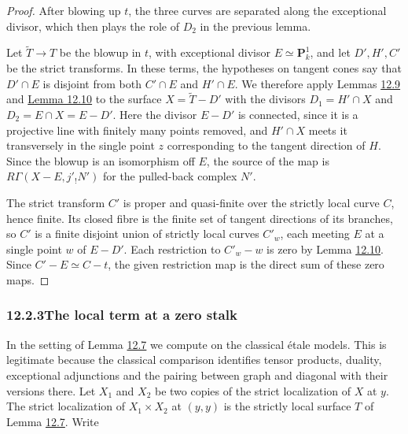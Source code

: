 \documentclass[11pt]{article}
\begin{document}
\begin{proof}[{Proof}]\label{bp35}%
After blowing up \(t\), the three curves are separated along the exceptional divisor, which then plays the role of \(D_2\) in the previous lemma.

Let \(\widetilde T\to T\) be the blowup in \(t\), with exceptional divisor \(E\simeq\mathbf P^1_k\), and let \(D',H',C'\) be the strict transforms. In these terms, the hypotheses on tangent cones say that \(D'\cap E\) is disjoint from both \(C'\cap E\) and \(H'\cap E\). We therefore apply Lemmas \hyperref[bp28]{12.9} and \hyperref[bp31]{Lemma 12.10} to the surface \(X=\widetilde T-D'\) with the divisors \(D_1=H'\cap X\) and \(D_2=E\cap X=E-D'\). Here the divisor \(E-D'\) is connected, since it is a projective line with finitely many points removed, and \(H'\cap X\) meets it transversely in the single point \(z\) corresponding to the tangent direction of \(H\). Since the blowup is an isomorphism off \(E\), the source of the map is \(R\Gamma(X-E,j'_!N')\) for the pulled-back complex \(N'\).

The strict transform \(C'\) is proper and quasi-finite over the strictly local curve \(C\), hence finite. Its closed fibre is the finite set of tangent directions of its branches, so \(C'\) is a finite disjoint union of strictly local curves \(C'_w\), each meeting \(E\) at a single point \(w\) of \(E-D'\). Each restriction to \(C'_w-w\) is zero by Lemma \hyperref[bp31]{12.10}. Since \(C'-E\simeq C-t\), the given restriction map is the direct sum of these zero maps.
\end{proof}


\subsubsection*{\texorpdfstring{12.2.3\quad The local term at a zero stalk}{12.2.3 The local term at a zero stalk}}
\label{bp36}%
\label{bp37}%
In the setting of Lemma \hyperref[bp21]{12.7} we compute on the classical étale models. This is legitimate because the classical comparison identifies tensor products, duality, exceptional adjunctions and the pairing between graph and diagonal with their versions there. Let \(X_1\) and \(X_2\) be two copies of the strict localization of \(X\) at \(y\). The strict localization of \(X_1\times X_2\) at \((y,y)\) is the strictly local surface \(T\) of Lemma \hyperref[bp21]{12.7}. Write
\end{document}
